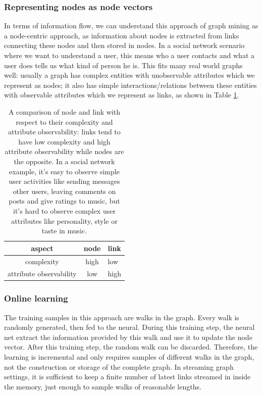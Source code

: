 \documentclass{article}
\begin{document}
\subsubsection{Representing nodes as node vectors}
In terms of information flow, we can understand this approach of graph mining as a node-centric approach, as information about nodes is extracted from links connecting these nodes and then stored in nodes. In a social network scenario where we want to understand a user, this means who a user contacts and what a user does tells us what kind of person he is. This fits many real world graphs well: usually a graph has complex entities with unobservable attributes which we represent as nodes; it also has simple interactions/relations between these entities with observable attributes which we represent as links, as shown in Table \ref{tab:nodes_vs_links}.

\begin{table}[h]
	\centering
	\begin{tabularx}{0.5\textwidth}{ |c|c|X| } \hline
		aspect  & node & link \\ \hline
		complexity & high & low \\ \hline
		attribute observability & low & high \\ \hline
	\end{tabularx}
	\caption{A comparison of node and link with respect to their complexity and attribute observability: links tend to have low complexity and high attribute observability while nodes are the opposite. In a social network example, it's easy to observe simple user activities like sending messages other users, leaving comments on posts and give ratings to music, but it's hard to observe complex user attributes like personality, style or taste in music.}
	\label{tab:nodes_vs_links}
\end{table}

\subsubsection{Online learning}
The training samples in this approach are walks in the graph. Every walk is randomly generated, then fed to the neural. During this training step, the neural net extract the information provided by this walk and use it to update the node vector. After this training step,  the random walk can be discarded. Therefore, the learning is incremental and only requires samples of different walks in the graph, not the construction or storage of the complete graph. In streaming graph settings, it is sufficient to keep a finite number of latest links streamed in inside the memory, just enough to sample walks of reasonable lengths.
\end{document}
